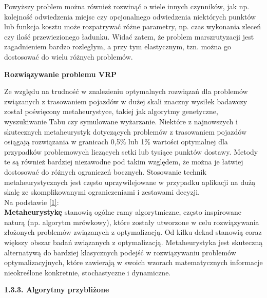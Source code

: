\documentclass[a4paper, twoside, 12pt, justified]{article}
\begin{document}
	\vspace{5mm} %
	
	Powyższy problem można również rozwinąć o wiele innych czynników, jak np. kolejność odwiedzenia miejsc czy opcjonalnego odwiedzenia niektórych punktów lub funkcja kosztu może rozpatrywać różne parametry, np. czas wykonania zleceń czy ilość przewiezionego ładunku. Widać zatem, że problem marszrutyzacji jest zagadnieniem bardzo rozległym, a przy tym elastycznym, tzn. można go dostosować do wielu różnych problemów.\\
	
	
	\begin{large}
		\begin{center}
			\textbf{Rozwiązywanie problemu VRP}
		\end{center}
	\end{large} 
	
	Ze względu na trudność w znalezieniu optymalnych rozwiązań dla problemów związanych z trasowaniem pojazdów w dużej skali znaczny wysiłek badawczy został poświęcony metaheurystyce, takiej jak algorytmy genetyczne, wyszukiwanie Tabu czy symulowane wyżarzanie. Niektóre z najnowszych i skutecznych metaheurystyk dotyczących problemów z trasowaniem pojazdów osiągają rozwiązania w granicach 0,5\% lub 1\% wartości optymalnej dla przypadków problemowych liczących setki lub tysiące punktów dostawy. Metody te są również bardziej niezawodne pod takim względem, że można je łatwiej dostosować do różnych ograniczeń bocznych. Stosowanie technik metaheurystycznych jest często uprzywilejowane w przypadku aplikacji na dużą skalę ze skomplikowanymi ograniczeniami i zestawami decyzji.\\
	
	Na podstawie \hyperlink{metaheurystyka}{[1]}:\\ 
	\textbf{Metaheurystykę} stanowią ogólne ramy algorytmiczne, często inspirowane naturą (np. algorytm mrówkowy), które zostały utworzone w celu rozwiązywania złożonych problemów związanych z optymalizacją. Od kilku dekad stanowią coraz większy obszar badań związanych z optymalizacją. Metaheurystyka jest skuteczną alternatywą
	do bardziej klasycznych podejść w rozwiązywaniu problemów optymalizacyjnych, które zawierają w swoich wzorach matematycznych informacje nieokreślone konkretnie, stochastyczne i dynamiczne.\\
	

	
	\newpage
	
	
	\begin{large}
		\textbf{1.3.3. Algorytmy przybliżone}
	\end{large}
	\vspace{5mm} %
	
\end{document}
